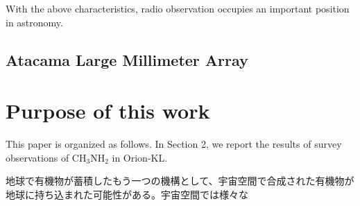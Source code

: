 With the above characteristics, radio observation occupies an important position in astronomy.

\subsection{Atacama Large Millimeter Array}

\section{Purpose of this work}
This paper is organized as follows. 
In Section 2, we report the results of survey observations of CH$_3$NH$_2$ in Orion-KL.



地球で有機物が蓄積したもう一つの機構として、宇宙空間で合成された有機物が地球に持ち込まれた可能性がある。宇宙空間では様々な
